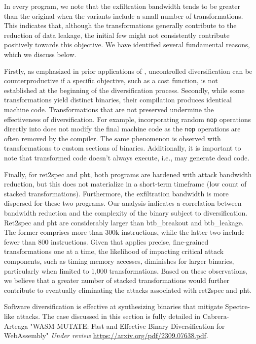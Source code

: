 In every program, we note that the exfiltration bandwidth tends to be greater than the original when the variants include a small number of transformations.
This indicates that, although the transformations generally contribute to the reduction of data leakage, the initial few might not consistently contribute positively towards this objective.
We have identified several fundamental reasons, which we discuss below.

Firstly, as emphasized in prior applications of \tool \cite{CABRERAARTEAGA2023103296}, uncontrolled diversification can be counterproductive if a specific objective, such as a cost function, is not established at the beginning of the diversification process.
Secondly, while some transformations yield distinct \wasm binaries, their compilation produces identical machine code.
Transformations that are not preserved undermine the effectiveness of diversification.
For example, incorporating random \texttt{nop} operations directly into \wasm does not modify the final machine code as the \texttt{nop} operations are often removed by the compiler.
The same phenomenon is observed with transformations to custom sections of \Wasm binaries.
Additionally, it is important to note that transformed code doesn't always execute, i.e., \tool may generate dead code.

Finally, for ret2spec and pht, both programs are hardened with attack bandwidth reduction, but this does not materialize in a short-term timeframe (low count of stacked transformations).
Furthermore,  the exfiltration bandwidth is more dispersed for these two programs.
Our analysis indicates a correlation between bandwidth reduction and the complexity of the binary subject to diversification.
Ret2spec and pht are considerably larger than btb\_breakout and btb\_leakage.
The former comprises more than 300k instructions, while the latter two include fewer than 800 instructions.
Given that \tool applies precise, fine-grained transformations one at a time, the likelihood of impacting critical attack components, such as timing memory accesses, diminishes for larger binaries, particularly when limited to 1,000 transformations.
Based on these observations, we believe that a greater number of stacked transformations would further contribute to eventually eliminating the attacks associated with ret2spec and pht.




\begin{tcolorbox}[title=Contribution paper,boxrule=1pt,arc=.2em,boxsep=1.0mm]
    Software diversification is effective at synthesizing \wasm binaries that mitigate Spectre-like attacks. 
    The case discussed in this section is fully detailed in Cabrera-Arteaga \etal "WASM-MUTATE: Fast and Effective Binary Diversification for WebAssembly"
    \emph{Under review}
    \url{https://arxiv.org/pdf/2309.07638.pdf}. 
\end{tcolorbox}



